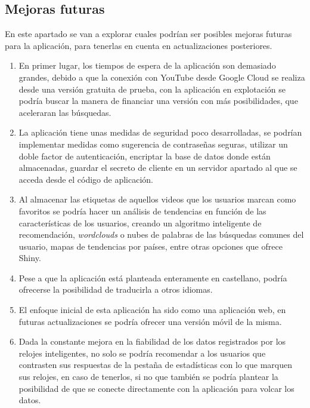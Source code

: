 \documentclass[a4paper,12pt,twoside]{memoir}
\begin{document}
\subsection{Mejoras futuras}
En este apartado se van a explorar cuales podrían ser posibles mejoras futuras para la aplicación, para tenerlas en cuenta en actualizaciones posteriores.
\begin{enumerate}
    \item En primer lugar, los tiempos de espera de la aplicación son demasiado grandes, debido a que la conexión con YouTube desde Google Cloud se realiza desde una versión gratuita de prueba, con la aplicación en explotación se podría buscar la manera de financiar una versión con más posibilidades, que aceleraran las búsquedas.
    \item La aplicación tiene unas medidas de seguridad poco desarrolladas, se podrían implementar medidas como sugerencia de contraseñas seguras, utilizar un doble factor de autenticación, encriptar la base de datos donde están almacenadas, guardar el secreto de cliente en un servidor apartado al que se acceda desde el código de aplicación.
    \item Al almacenar las etiquetas de aquellos videos que los usuarios marcan como favoritos se podría hacer un análisis de tendencias en función de las características de los usuarios, creando un algoritmo inteligente de recomendación, \textit{wordclouds} o nubes de palabras de las búsquedas comunes del usuario, mapas de tendencias por países, entre otras opciones que ofrece Shiny.
    \item Pese a que la aplicación está planteada enteramente en castellano, podría ofrecerse la posibilidad de traducirla a otros idiomas.
    \item El enfoque inicial de esta aplicación ha sido como una aplicación web, en futuras actualizaciones se podría ofrecer una versión móvil de la misma.
    \item  Dada la constante mejora en la fiabilidad de los datos registrados por los relojes inteligentes, no solo se podría recomendar a los usuarios que contrasten sus respuestas de la pestaña de estadísticas con lo que marquen sus relojes, en caso de tenerlos, si no que también se podría plantear la posibilidad de que se conecte directamente con la aplicación para volcar los datos.
\end{enumerate}
\end{document}
